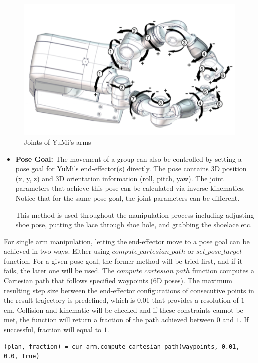 \begin{figure}[H]
\centering
\includegraphics[width = 0.7\columnwidth]{Implementation/mp/yumijoints.png}
\caption{Joints of YuMi's arms \citep{Productspecification}}
\label{yumijoint}
\end{figure}

\begin{itemize}
    \item \textbf{Pose Goal:} The movement of a group can also be controlled by setting a pose goal for YuMi's end-effector(s) directly. The pose contains 3D position (x, y, z) and 3D orientation information (roll, pitch, yaw). The joint parameters that achieve this pose can be calculated via inverse kinematics. Notice that for the same pose goal, the joint parameters can be different.
    
    This method is used throughout the manipulation process including adjusting shoe pose, putting the lace through shoe hole, and grabbing the shoelace etc.
\end{itemize}

For single arm manipulation, letting the end-effector move to a pose goal can be achieved in two ways. Either using $compute\_cartesian\_path$ or $set\_pose\_target$ function. For a given pose goal, the former method will be tried first, and if it fails, the later one will be used. The $compute\_cartesian\_path$ function computes a Cartesian path that follows specified waypoints (6D poses). The maximum resulting step size between the end-effector configurations of consecutive points in the result trajectory is predefined, which is 0.01 that provides a resolution of $1$ cm. Collision and kinematic will be checked and if these constraints cannot be met, the function will return a fraction of the path achieved between $0$ and $1$. If successful, fraction will equal to $1$.

\begin{verbatim}
(plan, fraction) = cur_arm.compute_cartesian_path(waypoints, 0.01, 0.0, True)
\end{verbatim}

